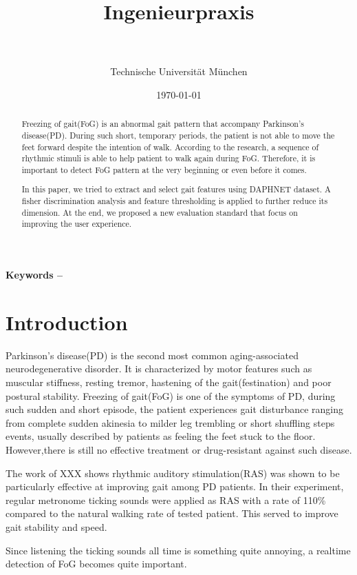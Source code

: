 \documentclass[article]{article}
\title{Ingenieurpraxis\\\mytitle}
\author{\myauthor\hspace{1em}\\\contact\\Technische Universität München}
\date{\today}
\begin{document}
\maketitle

\begin{abstract}
    Freezing of gait(FoG) is an abnormal gait pattern that accompany Parkinson's disease(PD). During such short, temporary periods, the patient is not able to move the feet forward despite the intention of walk. According to the research, a sequence of rhythmic stimuli is able to help patient to walk again during FoG. Therefore, it is important to detect FoG pattern at the very beginning or even before it comes.
    
    In this paper, we tried to extract and select gait features using DAPHNET dataset. A fisher discrimination analysis and feature thresholding is applied to further reduce its dimension. At the end, we proposed a new evaluation standard that focus on improving the user experience.
    
\end{abstract}  
\textbf{Keywords -- }{\mykeywords}

\section{Introduction}
    Parkinson's disease(PD) is the second most common aging-associated neurodegenerative disorder. It is characterized by motor features such as muscular stiffness, resting tremor, hastening of the gait(festination) and poor postural stability. Freezing of gait(FoG) is one of the symptoms of PD, during such sudden and short episode, the patient experiences gait disturbance ranging from complete sudden akinesia to milder leg trembling or short shuffling steps events, usually described by patients as feeling the feet stuck to the floor. However,there is still no effective treatment or drug-resistant against such disease.
    
    The work of XXX shows rhythmic auditory stimulation(RAS) was shown to be particularly effective at improving gait among PD patients. In their experiment, regular metronome ticking sounds were applied as RAS with a rate of 110\% compared to the natural walking rate of tested patient.
 	This served to improve gait stability and speed.
 	
 	Since listening the ticking sounds all time is something quite annoying, a realtime detection of FoG becomes quite important. 
 	
\end{document}
